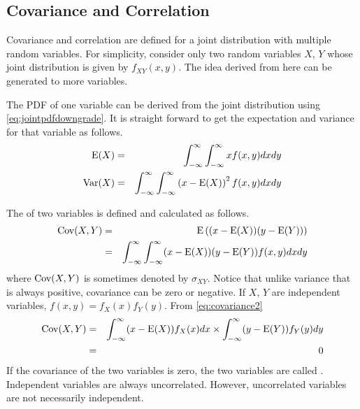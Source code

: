 \subsection{Covariance and Correlation}

Covariance and correlation are defined for a joint distribution with multiple random variables. For simplicity, consider only two random variables $X$, $Y$ whose joint distribution is given by $f_{XY}(x, y)$. The idea derived from here can be generated to more variables.

The PDF of one variable can be derived from the joint distribution using \eqref{eq:jointpdfdowngrade}. It is straight forward to get the expectation and variance for that variable as follows.
\begin{eqnarray}
	\textup{E}(X) &=& \int_{-\infty}^{\infty}\int_{-\infty}^{\infty}xf(x, y)dxdy \nonumber \\
	\textup{Var}(X) &=& \int_{-\infty}^{\infty}\int_{-\infty}^{\infty}\left(x-\textup{E}(X)\right)^2f(x, y)dxdy \nonumber
\end{eqnarray}

The  of two variables is defined and calculated as follows.
\begin{eqnarray}
	\textup{Cov}(X, Y) &=& \textup{E}\left((x - \textup{E}(X))(y - \textup{E}(Y))\right) \label{eq:covariance1} \\
	&=& \int_{-\infty}^{\infty}\int_{-\infty}^{\infty}(x - \textup{E}(X))(y - \textup{E}(Y))f(x, y)dxdy \label{eq:covariance2}
\end{eqnarray}
where $\textup{Cov}(X, Y)$ is sometimes denoted by $\sigma_{XY}$. Notice that unlike variance that is always positive, covariance can be zero or negative. If $X$, $Y$ are independent variables, $f(x,y) = f_X(x)f_Y(y)$. From \eqref{eq:covariance2}
\begin{eqnarray}
	\textup{Cov}(X, Y) &=& \int_{-\infty}^{\infty}(x - \textup{E}(X))f_X(x)dx \times \int_{-\infty}^{\infty}(y - \textup{E}(Y))f_Y(y)dy \nonumber \\
	&=& 0 \nonumber
\end{eqnarray}
If the covariance of the two variables is zero, the two variables are called . Independent variables are always uncorrelated. However, uncorrelated variables are not necessarily independent.

